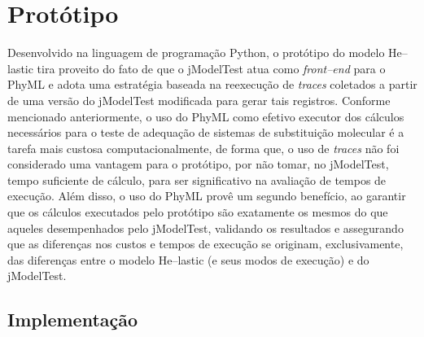 \documentclass[english,brazilian]{UNISINOSmonografia} %
\begin{document}
%














\section{Protótipo}


Desenvolvido na linguagem de programação Python, o protótipo do modelo \textsf{He}--lastic tira proveito do fato de que o jModelTest atua como \textit{front--end} para o PhyML e adota uma estratégia baseada na reexecução de \textit{traces} coletados a partir de uma versão do jModelTest modificada para gerar tais registros.
%
Conforme mencionado anteriormente, o uso do PhyML como efetivo executor dos cálculos necessários para o teste de adequação de sistemas de substituição molecular é a tarefa mais custosa computacionalmente, de forma que, o uso de \textit{traces} não foi considerado uma vantagem para o protótipo, por não tomar, no jModelTest, tempo suficiente de cálculo, para ser significativo na avaliação de tempos de execução.
%
Além disso, o uso do PhyML provê um segundo benefício, ao garantir que os cálculos executados pelo protótipo são exatamente os mesmos do que aqueles desempenhados pelo jModelTest, validando os resultados e assegurando que as diferenças nos custos e tempos de execução se originam, exclusivamente, das diferenças entre o modelo \textsf{He}--lastic (e seus modos de execução) e do jModelTest.








\subsection{Implementação}
\end{document}
